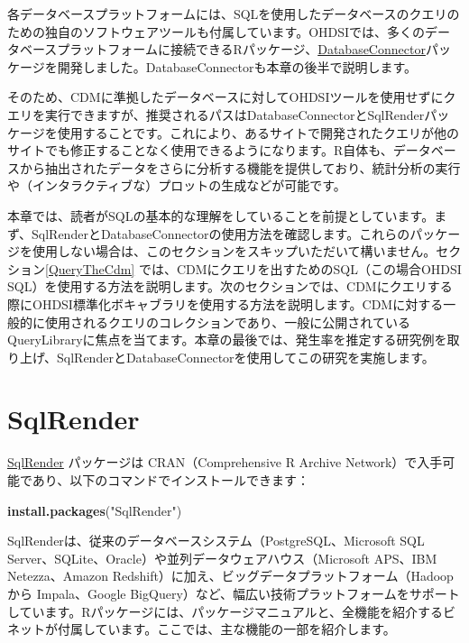 \documentclass[
  11pt]{book}
\newenvironment{Shaded}{\begin{snugshade}}{\end{snugshade}}
\newcommand{\FunctionTok}[1]{\textcolor[rgb]{0.13,0.29,0.53}{\textbf{#1}}}
\newcommand{\NormalTok}[1]{#1}
\newcommand{\StringTok}[1]{\textcolor[rgb]{0.31,0.60,0.02}{#1}}
\theoremstyle{definition}
\theoremstyle{definition}
\theoremstyle{definition}
\theoremstyle{definition}
\theoremstyle{remark}
\begin{document}
各データベースプラットフォームには、SQLを使用したデータベースのクエリのための独自のソフトウェアツールも付属しています。OHDSIでは、多くのデータベースプラットフォームに接続できるRパッケージ、\href{https://ohdsi.github.io/DatabaseConnector/}{DatabaseConnector}パッケージを開発しました。DatabaseConnectorも本章の後半で説明します。 

そのため、CDMに準拠したデータベースに対してOHDSIツールを使用せずにクエリを実行できますが、推奨されるパスはDatabaseConnectorとSqlRenderパッケージを使用することです。これにより、あるサイトで開発されたクエリが他のサイトでも修正することなく使用できるようになります。R自体も、データベースから抽出されたデータをさらに分析する機能を提供しており、統計分析の実行や（インタラクティブな）プロットの生成などが可能です。 

本章では、読者がSQLの基本的な理解をしていることを前提としています。まず、SqlRenderとDatabaseConnectorの使用方法を確認します。これらのパッケージを使用しない場合は、このセクションをスキップいただいて構いません。セクション\ref{QueryTheCdm} では、CDMにクエリを出すためのSQL（この場合OHDSI SQL）を使用する方法を説明します。次のセクションでは、CDMにクエリする際にOHDSI標準化ボキャブラリを使用する方法を説明します。CDMに対する一般的に使用されるクエリのコレクションであり、一般に公開されているQueryLibraryに焦点を当てます。本章の最後では、発生率を推定する研究例を取り上げ、SqlRenderとDatabaseConnectorを使用してこの研究を実施します。  

\section{SqlRender}\label{SqlRender}

\href{https://ohdsi.github.io/SqlRender/}{SqlRender} パッケージは CRAN（Comprehensive R Archive Network）で入手可能であり、以下のコマンドでインストールできます：

\begin{Shaded}
\begin{Highlighting}[]
\FunctionTok{install.packages}\NormalTok{(}\StringTok{"SqlRender"}\NormalTok{)}
\end{Highlighting}
\end{Shaded}

SqlRenderは、従来のデータベースシステム（PostgreSQL、Microsoft SQL Server、SQLite、Oracle）や並列データウェアハウス（Microsoft APS、IBM Netezza、Amazon Redshift）に加え、ビッグデータプラットフォーム（Hadoop から Impala、Google BigQuery）など、幅広い技術プラットフォームをサポートしています。Rパッケージには、パッケージマニュアルと、全機能を紹介するビネットが付属しています。ここでは、主な機能の一部を紹介します。
\end{document}
